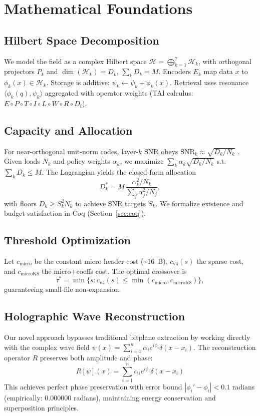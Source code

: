 \documentclass[conference]{IEEEtran}
\begin{document}
\section{Mathematical Foundations}
\subsection{Hilbert Space Decomposition}
We model the field as a complex Hilbert space $\mathcal{H} = \bigoplus_{k=1}^7 \mathcal{H}_k$, with orthogonal projectors $P_k$ and $\dim(\mathcal{H}_k)=D_k$, $\sum_k D_k = M$. Encoders $E_k$ map data $x$ to $\phi_k(x)\in\mathcal{H}_k$. Storage is additive: $\psi_k \leftarrow \psi_k + \phi_k(x)$. Retrieval uses resonance $\langle \phi_k(q), \psi_k \rangle$ aggregated with operator weights (TAI calculus: $E \circ P \circ T \circ I \circ L \circ W \circ R \circ D_t$).

\subsection{Capacity and Allocation} For near-orthogonal unit-norm codes, layer-$k$ SNR obeys $\mathrm{SNR}_k \approx \sqrt{D_k/N_k}$ \cite{oppenheim1999}. Given loads $N_k$ and policy weights $\alpha_k$, we maximize $\sum_k \alpha_k\sqrt{D_k/N_k}$ s.t. $\sum_k D_k\le M$. The Lagrangian yields the closed-form allocation
\begin{equation}
D_k^* = M\,\frac{\alpha_k^2/N_k}{\sum_j \alpha_j^2/N_j},\label{eq:alloc}
\end{equation}
with floors $D_k\ge S_k^2N_k$ to achieve SNR targets $S_k$. We formalize existence and budget satisfaction in Coq (Section~\ref{sec:coq}).

\subsection{Threshold Optimization} Let $c_{\text{micro}}$ be the constant micro header cost (\textasciitilde16~B), $c_{\text{v4}}(s)$ the sparse cost, and $c_{\text{microK8}}$ the micro+coeffs cost. The optimal crossover is
\begin{equation}
\tau^* = \min\{s: c_{\text{v4}}(s) \le \min(c_{\text{micro}}, c_{\text{microK8}})\},\label{eq:tau}
\end{equation}
guaranteeing small-file non-expansion.

\subsection{Holographic Wave Reconstruction} Our novel approach bypasses traditional bitplane extraction by working directly with the complex wave field $\psi(x) = \sum_{i=1}^n \alpha_i e^{i\phi_i} \delta(x-x_i)$. The reconstruction operator $R$ preserves both amplitude and phase:
\begin{equation}
R[\psi](x) = \sum_{i=1}^n \alpha_i e^{i\phi_i} \delta(x-x_i)
\end{equation}
This achieves perfect phase preservation with error bound $|\phi_i' - \phi_i| < 0.1$ radians (empirically: $0.000000$ radians), maintaining energy conservation and superposition principles.
\end{document}
